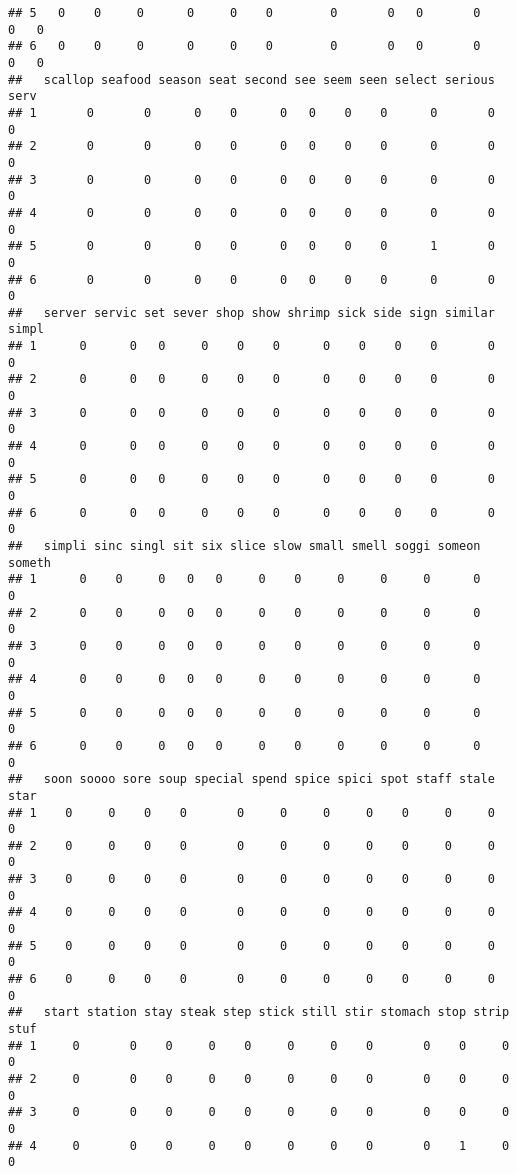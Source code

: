 \documentclass[]{article}
\begin{document}
\begin{verbatim}
## 5   0    0     0      0     0    0        0       0   0       0    0   0
## 6   0    0     0      0     0    0        0       0   0       0    0   0
##   scallop seafood season seat second see seem seen select serious serv
## 1       0       0      0    0      0   0    0    0      0       0    0
## 2       0       0      0    0      0   0    0    0      0       0    0
## 3       0       0      0    0      0   0    0    0      0       0    0
## 4       0       0      0    0      0   0    0    0      0       0    0
## 5       0       0      0    0      0   0    0    0      1       0    0
## 6       0       0      0    0      0   0    0    0      0       0    0
##   server servic set sever shop show shrimp sick side sign similar simpl
## 1      0      0   0     0    0    0      0    0    0    0       0     0
## 2      0      0   0     0    0    0      0    0    0    0       0     0
## 3      0      0   0     0    0    0      0    0    0    0       0     0
## 4      0      0   0     0    0    0      0    0    0    0       0     0
## 5      0      0   0     0    0    0      0    0    0    0       0     0
## 6      0      0   0     0    0    0      0    0    0    0       0     0
##   simpli sinc singl sit six slice slow small smell soggi someon someth
## 1      0    0     0   0   0     0    0     0     0     0      0      0
## 2      0    0     0   0   0     0    0     0     0     0      0      0
## 3      0    0     0   0   0     0    0     0     0     0      0      0
## 4      0    0     0   0   0     0    0     0     0     0      0      0
## 5      0    0     0   0   0     0    0     0     0     0      0      0
## 6      0    0     0   0   0     0    0     0     0     0      0      0
##   soon soooo sore soup special spend spice spici spot staff stale star
## 1    0     0    0    0       0     0     0     0    0     0     0    0
## 2    0     0    0    0       0     0     0     0    0     0     0    0
## 3    0     0    0    0       0     0     0     0    0     0     0    0
## 4    0     0    0    0       0     0     0     0    0     0     0    0
## 5    0     0    0    0       0     0     0     0    0     0     0    0
## 6    0     0    0    0       0     0     0     0    0     0     0    0
##   start station stay steak step stick still stir stomach stop strip stuf
## 1     0       0    0     0    0     0     0    0       0    0     0    0
## 2     0       0    0     0    0     0     0    0       0    0     0    0
## 3     0       0    0     0    0     0     0    0       0    0     0    0
## 4     0       0    0     0    0     0     0    0       0    1     0    0

\end{verbatim}
\end{document}
